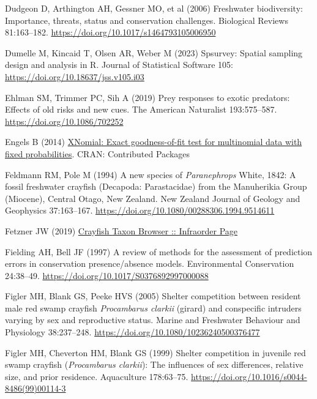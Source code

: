 \documentclass[
  12pt,
  a4paper,
]{scrbook}
\newlength{\cslhangindent}
\newenvironment{CSLReferences}[2] %
 {\begin{list}{}{%
  \setlength{\itemindent}{0pt}
  \setlength{\leftmargin}{0pt}
  \setlength{\parsep}{0pt}
  \ifodd #1
   \setlength{\leftmargin}{\cslhangindent}
   \setlength{\itemindent}{-1\cslhangindent}
  \fi
  \setlength{\itemsep}{#2\baselineskip}}}
 {\end{list}}
\begin{document}
\begin{CSLReferences}{1}{1}
Dudgeon D, Arthington AH, Gessner MO, et al (2006) Freshwater
biodiversity: Importance, threats, status and conservation challenges.
Biological Reviews 81:163--182.
\url{https://doi.org/10.1017/s1464793105006950}

Dumelle M, Kincaid T, Olsen AR, Weber M (2023) Spsurvey: Spatial
sampling design and analysis in {R}. Journal of Statistical Software
105: \url{https://doi.org/10.18637/jss.v105.i03}

Ehlman SM, Trimmer PC, Sih A (2019) Prey responses to exotic predators:
Effects of old risks and new cues. The American Naturalist 193:575--587.
\url{https://doi.org/10.1086/702252}

Engels B (2014)
\href{https://doi.org/10.32614/cran.package.xnomial}{{XNomial}: Exact
goodness-of-fit test for multinomial data with fixed probabilities}.
CRAN: Contributed Packages

Feldmann RM, Pole M (1994) A new species of {\emph{Paranephrops}}
{White}, 1842: A fossil freshwater crayfish ({Decapoda}: {Parastacidae})
from the {Manuherikia Group} ({Miocene}), {Central Otago}, {New
Zealand}. New Zealand Journal of Geology and Geophysics 37:163--167.
\url{https://doi.org/10.1080/00288306.1994.9514611}

Fetzner JW (2019)
\href{https://www.invertebratezoology.org/NewAstacidea/infraorder.asp?io=Astacidea}{Crayfish
{Taxon Browser :: Infraorder Page}}

Fielding AH, Bell JF (1997) A review of methods for the assessment of
prediction errors in conservation presence/absence models. Environmental
Conservation 24:38--49. \url{https://doi.org/10.1017/S0376892997000088}

Figler MH, Blank GS, Peeke HVS (2005) Shelter competition between
resident male red swamp crayfish {\emph{Procambarus clarkii}} (girard)
and conspecific intruders varying by sex and reproductive status. Marine
and Freshwater Behaviour and Physiology 38:237--248.
\url{https://doi.org/10.1080/10236240500376477}

Figler MH, Cheverton HM, Blank GS (1999) Shelter competition in juvenile
red swamp crayfish ({\emph{Procambarus clarkii}}): The influences of sex
differences, relative size, and prior residence. Aquaculture 178:63--75.
\url{https://doi.org/10.1016/s0044-8486(99)00114-3}


\end{CSLReferences}
\end{document}
